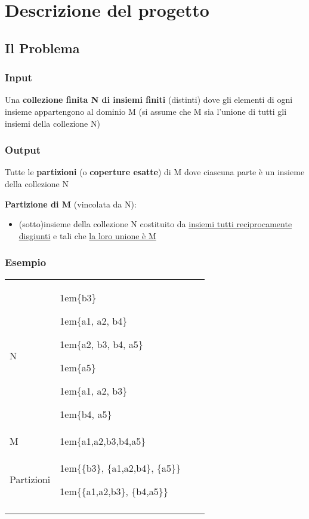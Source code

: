 \chapter{Descrizione del progetto}

\section{Il Problema}

\subsection{Input}
Una \textbf{collezione finita N di insiemi finiti} (distinti) dove gli elementi di ogni insieme appartengono al dominio M (si assume che M sia l’unione di tutti gli insiemi della collezione N)

\subsection{Output}
Tutte le \textbf{partizioni} (o \textbf{coperture esatte}) di M dove ciascuna parte è un insieme della collezione N

\textbf{Partizione di M} (vincolata da N):
\begin{itemize}
    \item (sotto)insieme della collezione N costituito da \underline{insiemi tutti reciprocamente disgiunti} e tali che \underline{la loro unione è M}
\end{itemize}

\subsection{Esempio}
\newcommand\xxx{\par\hangindent1em\makebox[1em][l]{}}
\begin{tabular}{p{}p{}lp{2in}}\toprule
    N & 
        \xxx \{b3\}
        \xxx \{a1, a2, b4\}
        \xxx \{a2, b3, b4, a5\}  
        \xxx \{a5\}  
        \xxx \{a1, a2, b3\}  
        \xxx \{b4, a5\} \\
    \addlinespace
    M & 
        \xxx \{a1,a2,b3,b4,a5\}\\
    \addlinespace
    Partizioni & 
        \xxx \{\{b3\}, \{a1,a2,b4\}, \{a5\}\}  
        \xxx \{\{a1,a2,b3\}, \{b4,a5\}\}\\
    \\\bottomrule
\end{tabular}

